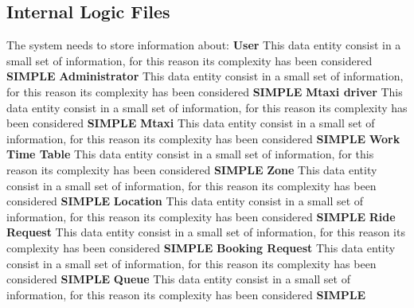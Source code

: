 \documentclass[11pt,titlepage]{article} %
\begin{document}
  \subsection{Internal Logic Files}
     The system needs to store information about: \newline \newline
     \textbf{User}\newline
     This data entity consist in a small set of information, for this reason its complexity has been considered \textbf{SIMPLE}\newline\newline
     \textbf{Administrator}\newline
     This data entity consist in a small set of information, for this reason its complexity has been considered \textbf{SIMPLE}\newline\newline
     \textbf{Mtaxi driver}\newline
     This data entity consist in a small set of information, for this reason its complexity has been considered \textbf{SIMPLE}\newline\newline
     \noindent \textbf{Mtaxi}\newline
     This data entity consist in a small set of information, for this reason its complexity has been considered \textbf{SIMPLE}\newline\newline
     \textbf{Work Time Table}\newline
     This data entity consist in a small set of information, for this reason its complexity has been considered \textbf{SIMPLE}\newline\newline
     \textbf{Zone}\newline
     This data entity consist in a small set of information, for this reason its complexity has been considered \textbf{SIMPLE}\newline\newline
     \textbf{Location}\newline
     This data entity consist in a small set of information, for this reason its complexity has been considered \textbf{SIMPLE}\newline\newline
     \textbf{Ride Request} 
     This data entity consist in a small set of information, for this reason its complexity has been considered \textbf{SIMPLE}\newline\newline
     \textbf{Booking Request}
     This data entity consist in a small set of information, for this reason its complexity has been considered \textbf{SIMPLE}\newline\newline
     \textbf{Queue}
     This data entity consist in a small set of information, for this reason its complexity has been considered \textbf{SIMPLE}\newline
     
\end{document}
